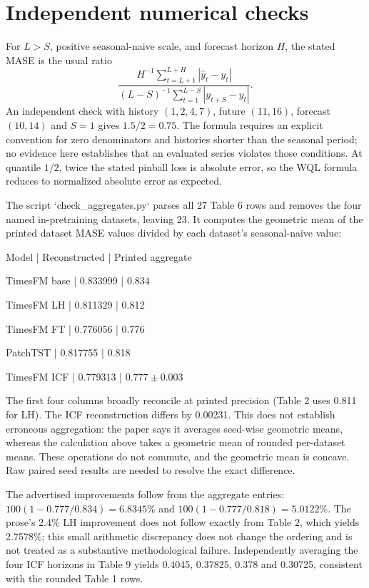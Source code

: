 \documentclass[10pt]{article}
\begin{document}
\section*{Independent numerical checks}
For \(L>S\), positive seasonal-naive scale, and forecast horizon \(H\), the stated MASE is the usual ratio \[\frac{H^{-1}\sum_{t=L+1}^{L+H}|\widehat y_t-y_t|}
 {(L-S)^{-1}\sum_{t=1}^{L-S}|y_{t+S}-y_t|}.\] An independent check with history \((1,2,4,7)\), future \((11,16)\), forecast \((10,14)\) and \(S=1\) gives \(1.5/2=0.75\). The formula requires an explicit convention for zero denominators and histories shorter than the seasonal period; no evidence here establishes that an evaluated series violates those conditions. At quantile \(1/2\), twice the stated pinball loss is absolute error, so the WQL formula reduces to normalized absolute error as expected.\par
The script `check\_aggregates.py` parses all 27 Table 6 rows and removes the four named in-pretraining datasets, leaving 23. It computes the geometric mean of the printed dataset MASE values divided by each dataset’s seasonal-naive value:\par
Model | Reconstructed | Printed aggregate\par
TimesFM base | 0.833999 | 0.834\par
TimesFM LH | 0.811329 | 0.812\par
TimesFM FT | 0.776056 | 0.776\par
PatchTST | 0.817755 | 0.818\par
TimesFM ICF | 0.779313 | \(0.777\pm0.003\)\par
The first four columns broadly reconcile at printed precision (Table 2 uses 0.811 for LH). The ICF reconstruction differs by 0.00231. This does not establish erroneous aggregation: the paper says it averages seed-wise geometric means, whereas the calculation above takes a geometric mean of rounded per-dataset means. These operations do not commute, and the geometric mean is concave. Raw paired seed results are needed to resolve the exact difference.\par
The advertised improvements follow from the aggregate entries: \(100(1-0.777/0.834)=6.8345\%\) and \(100(1-0.777/0.818)=5.0122\%\). The prose’s 2.4\% LH improvement does not follow exactly from Table 2, which yields 2.7578\%; this small arithmetic discrepancy does not change the ordering and is not treated as a substantive methodological failure. Independently averaging the four ICF horizons in Table 9 yields 0.4045, 0.37825, 0.378 and 0.30725, consistent with the rounded Table 1 rows.\par
\end{document}
